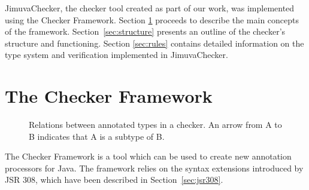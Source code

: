 \documentclass{pracamgr}
\theoremstyle{break}
\theoremstyle{break}
\theoremstyle{break}
\begin{document}
JimuvaChecker, the checker tool created as part of our work, was
implemented using the Checker Framework.  Section \ref{sec:framework}
proceeds to describe the main concepts of the
framework. Section~\ref{sec:structure} presents an outline of the
checker's structure and functioning.  Section \ref{sec:rules} contains
detailed information on the type system and verification implemented
in JimuvaChecker.

\section{The Checker Framework}
\label{sec:framework}

\begin{figure}
  \centering
  
  \caption{Relations between annotated types in a checker. An arrow from
    A to B indicates that A is a subtype of B.}
  \label{fig:example-checker-hierarchy}
\end{figure}

The Checker Framework is a tool which can be used to create new
annotation processors for Java. The framework relies on the syntax
extensions introduced by JSR 308, which have been described in
Section~\ref{sec:jsr308}. 
\end{document}
